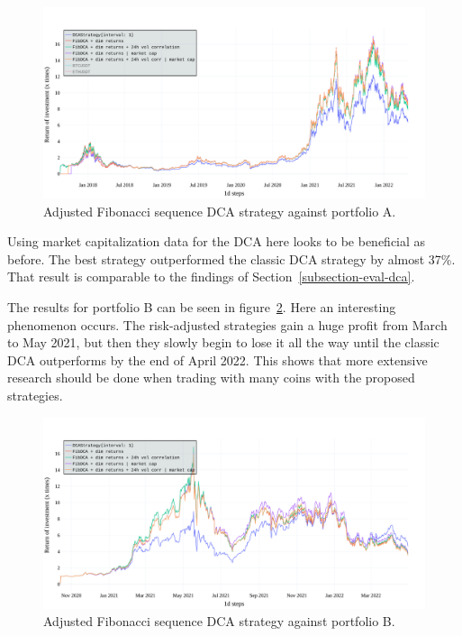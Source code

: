 \begin{figure}[!hbt]
    \centering
    \includegraphics[width=\columnwidth]{figures/fibseq-portfolio-A.pdf}
    \caption{Adjusted Fibonacci sequence DCA strategy against portfolio A.}
    \label{figure-fibseq-portfolio-A}
\end{figure}

Using market capitalization data for the DCA here looks to be beneficial as before. The best strategy outperformed the classic DCA strategy by almost 37\%. That result is comparable to the findings of Section~\ref{subsection-eval-dca}.

The results for portfolio B can be seen in figure~\ref{figure-fibseq-portfolio-B}. Here an interesting phenomenon occurs. The risk-adjusted strategies gain a huge profit from March to May 2021, but then they slowly begin to lose it all the way until the classic DCA outperforms by the end of April 2022. This shows that more extensive research should be done when trading with many coins with the proposed strategies.

\begin{figure}[!hbt]
    \centering
    \includegraphics[width=\columnwidth]{figures/fibseq-portfolio-B.pdf}
    \caption{Adjusted Fibonacci sequence DCA strategy against portfolio B.}
    \label{figure-fibseq-portfolio-B}
\end{figure}

